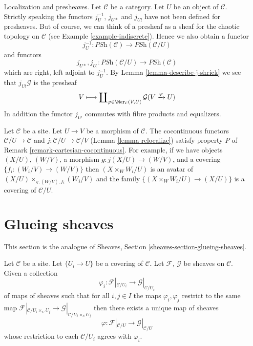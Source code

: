 \begin{remark}
\label{remark-localize-presheaves}
Localization and presheaves. Let $\mathcal{C}$ be a category.
Let $U$ be an object of $\mathcal{C}$. Strictly speaking the functors
$j_U^{-1}$, $j_{U*}$ and $j_{U!}$ have not been defined for presheaves.
But of course, we can think of a presheaf as a sheaf for the
chaotic topology on $\mathcal{C}$ (see Example \ref{example-indiscrete}).
Hence we also obtain a functor
$$
j_U^{-1} :
\textit{PSh}(\mathcal{C})
\longrightarrow
\textit{PSh}(\mathcal{C}/U)
$$
and functors
$$
j_{U*}, j_{U!} :
\textit{PSh}(\mathcal{C}/U)
\longrightarrow
\textit{PSh}(\mathcal{C})
$$
which are right, left adjoint to $j_U^{-1}$. By
Lemma \ref{lemma-describe-j-shriek}
we see that $j_{U!}\mathcal{G}$ is the presheaf
$$
V \longmapsto
\coprod\nolimits_{\varphi \in \Mor_\mathcal{C}(V, U)}
\mathcal{G}(V \xrightarrow{\varphi} U)
$$
In addition the functor $j_{U!}$ commutes with fibre products and
equalizers.
\end{remark}

\begin{remark}
\label{remark-localization-cartesian-cocontinuous}
Let $\mathcal{C}$ be a site. Let $U \to V$ be a morphism of $\mathcal{C}$.
The cocontinuous functors $\mathcal{C}/U \to \mathcal{C}$ and
$j : \mathcal{C}/U \to \mathcal{C}/V$ (Lemma \ref{lemma-relocalize})
satisfy property $P$ of Remark \ref{remark-cartesian-cocontinuous}.
For example, if we have objects $(X/U)$, $(W/V)$, a morphism
$g : j(X/U) \to (W/V)$, and a covering $\{f_i  : (W_i/V) \to (W/V)\}$ then
$(X \times_W W_i/U)$ is an avatar of $(X/U) \times_{g, (W/V), f_i} (W_i/V)$
and the family $\{(X \times_W W_i/U) \to (X/U)\}$ is a covering
of $\mathcal{C}/U$.
\end{remark}






\section{Glueing sheaves}
\label{section-glueing-sheaves}

\noindent
This section is the analogue of
Sheaves, Section \ref{sheaves-section-glueing-sheaves}.

\begin{lemma}
\label{lemma-glue-maps}
Let $\mathcal{C}$ be a site.
Let $\{U_i \to U\}$ be a covering of $\mathcal{C}$.
Let $\mathcal{F}$, $\mathcal{G}$ be sheaves on $\mathcal{C}$.
Given a collection
$$
\varphi_i :
\mathcal{F}|_{\mathcal{C}/U_i}
\longrightarrow
\mathcal{G}|_{\mathcal{C}/U_i}
$$
of maps of sheaves such that for all $i, j \in I$ the maps
$\varphi_i, \varphi_j$ restrict to the same map
$\mathcal{F}|_{\mathcal{C}/U_i \times_U U_j} \to
\mathcal{G}|_{\mathcal{C}/U_i \times_U U_j}$
then there exists a unique map of sheaves
$$
\varphi :
\mathcal{F}|_{\mathcal{C}/U}
\longrightarrow
\mathcal{G}|_{\mathcal{C}/U}
$$
whose restriction to each $\mathcal{C}/U_i$ agrees with $\varphi_i$.
\end{lemma}

